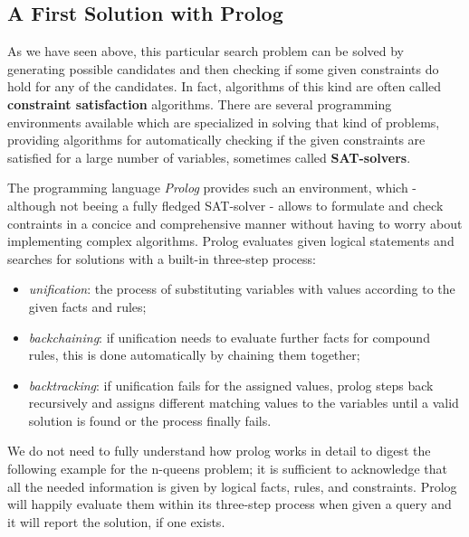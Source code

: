 \subsection{A First Solution with Prolog}

As we have seen above, this particular search problem can be solved by generating possible candidates and then checking if some given constraints do hold for any of the candidates.
In fact, algorithms of this kind are often called \textbf{constraint satisfaction} algorithms.
There are several programming environments available which are specialized in solving that kind of problems, providing algorithms for automatically checking if the given constraints are satisfied for a large number of variables, sometimes called \textbf{SAT-solvers}.

The programming language \emph{Prolog} provides such an environment, which - although not beeing a fully fledged SAT-solver - allows to formulate and check contraints in a concice and comprehensive manner without having to worry about implementing complex algorithms.
Prolog evaluates given logical statements and searches for solutions with a built-in three-step process:
\begin{itemize}
  \item \emph{unification}: the process of substituting variables with values according to the given facts and rules;
  \item \emph{backchaining}: if unification needs to evaluate further facts for compound rules, this is done automatically by chaining them together;
  \item \emph{backtracking}: if unification fails for the assigned values, prolog steps back recursively and assigns different matching values to the variables until a valid solution is found or the process finally fails.
\end{itemize}

We do not need to fully understand how prolog works in detail to digest the following example for the n-queens problem; it is sufficient to acknowledge that all the needed information is given by logical facts, rules, and constraints. Prolog will happily evaluate them within its three-step process when given a query and it will report the solution, if one exists.

